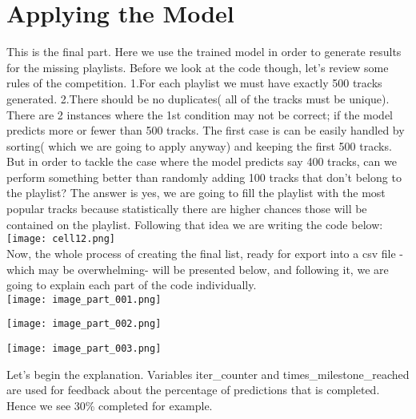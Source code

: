 \documentclass[]{article}
\begin{document}
\section{Applying the Model}
This is the final part. Here we use the trained model in order to generate results for the missing playlists. Before we look at the code though, let's review some rules of the competition. 1.For each playlist we must have exactly 500 tracks generated. 2.There should be no duplicates( all of the tracks must be unique). There are 2 instances where the 1st condition may not be correct; if the model predicts more or fewer than 500 tracks. The first case is can be easily handled by sorting( which we are going to apply anyway) and keeping the first 500 tracks. But in order to tackle the case where the model predicts say 400 tracks, can we perform something better than randomly adding 100 tracks that don't belong to the playlist? The answer is yes, we are going to fill the playlist with the most popular tracks because statistically there are higher chances those will be contained on the playlist. Following that idea we are writing the code below:
\\
\texttt{[image: cell12.png]}
\noindent
\\

Now, the whole process of creating the final list, ready for export into a csv file -which may be overwhelming- will be presented
below, and following it, we are going to explain each part of the code individually.
\\
\texttt{[image: image\_part\_001.png]}

\texttt{[image: image\_part\_002.png]}

\texttt{[image: image\_part\_003.png]}

Let's begin the explanation. Variables iter\_counter and times\_milestone\_reached are used for feedback about the percentage of predictions that is completed. Hence we see 30\% completed for example.
\end{document}
